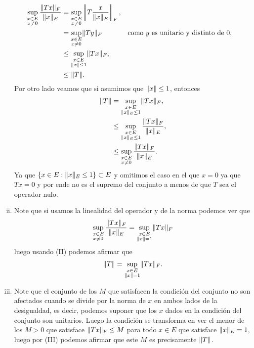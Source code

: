 \begin{homeworkProblem}
\begin{solution}
\begin{enumerate}[(i)]
        \begin{align*}
          \sup_{\substack{x\in E\\x\neq 0}}\frac{\lVert Tx\rVert_{F}}{\lVert x\rVert_{E}}&=\sup_{\substack{x\in E\\x\neq 0}}\left\|T\frac{x}{\lVert x\rVert_{E}}\right\|_{F},\\
          &=\sup_{\substack{x\in E\\x\neq 0}}\lVert Ty\rVert_{F} &&\text{como $y$ es unitario y distinto de $0$},\\
          &\leq \sup_{\substack{x\in E\\\lVert x\rVert\leq 1}}\lVert Tx\rVert_{F},\\
          &\leq \lVert T\rVert.
        \end{align*}
        Por otro lado veamos que si asumimos que $\lVert x\rVert\leq 1$, entonces
        \begin{align*}
          \lVert T\rVert&= \sup_{\substack{x\in E\\\lVert x\rVert_{E}\leq 1}}\lVert Tx\rVert_{F},\\
          &\leq \sup_{\substack{x\in E\\ \lVert x\rVert_{E}\leq 1}}\frac{\lVert Tx\rVert_{F}}{\lVert x\rVert_{E}},\\
          &\leq \sup_{\substack{x\in E\\x\neq 0}}\frac{\lVert Tx\rVert_{F}}{\lVert x\rVert_{E}}.
        \end{align*}
        Ya que $\{x\in E:\lVert x\rVert_{E}\leq 1\}\subset E$ y omitimos el caso en el que $x=0$ ya que $Tx=0$ y por ende no es el supremo del conjunto a menos de que $T$ sea el operador nulo.
      \item Note que si usamos la linealidad del operador y de la norma podemos ver que
        \begin{align*}
          \sup_{\substack{x\in E\\x\neq 0}}\frac{\lVert Tx\rVert_{F}}{\lVert x\rVert_{E}}=\sup_{\substack{x\in E\\\lVert x\rVert=1}}\lVert Tx\rVert_{F}
        \end{align*}
        luego usando (II) podemos afirmar que
        \begin{align*}
          \lVert T\rVert=\sup_{\substack{x\in E\\\lVert x\rVert=1}}\lVert Tx\rVert_{F}.
        \end{align*}
      \item Note que el conjunto de los $M$ que satisfacen la condición del conjunto no son afectados cuando se divide por la norma de $x$ en ambos lados de la desigualdad, es decir, podemos suponer que los $x$ dados en la condición del conjunto son unitarios. Luego la condición se transforma en ver el menor de los $M>0$ que satisface $\lVert Tx\rVert_{F}\leq M$ para todo $x\in E$ que satisface $\lVert x\rVert_{E}=1$, luego por (III) podemos afirmar que este $M$ es precisamente $\lVert T\rVert$. 
    \end{enumerate}
  \end{solution}
\end{homeworkProblem}
